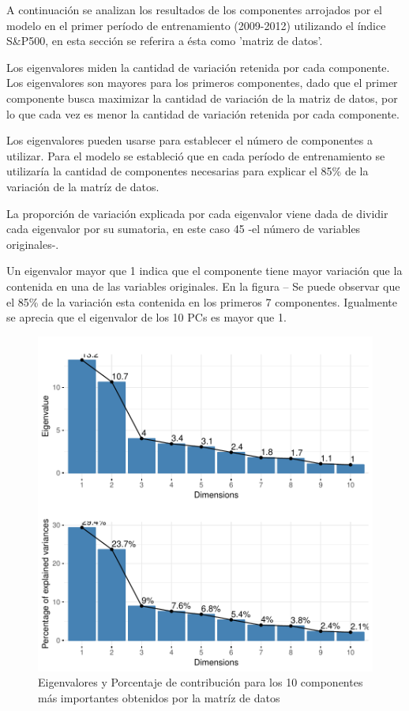 \documentclass[a4paper,12pt]{Latex/Classes/PhDthesisPSnPDF}
\begin{document}
A continuación se analizan los resultados de los componentes arrojados por el modelo en el primer período de entrenamiento (2009-2012) utilizando el índice S&P500, en esta sección se referira a ésta como 'matriz de datos'.


Los eigenvalores miden la cantidad de variación retenida por cada componente. Los eigenvalores son mayores para los primeros componentes, dado que el primer componente busca maximizar la cantidad de variación de la matriz de datos, por lo que cada vez es menor la cantidad de variación retenida por cada componente.

Los eigenvalores pueden usarse para establecer el número de componentes a utilizar. Para el modelo se estableció que en cada período de entrenamiento se utilizaría la cantidad de componentes necesarias para explicar el 85\% de la variación de la matríz de datos.

La proporción de variación explicada por cada eigenvalor viene dada de dividir cada eigenvalor por su sumatoria, en este caso 45 -el número de variables originales-.

Un eigenvalor mayor que 1 indica que el componente tiene mayor variación que la contenida en una de las variables originales. En la figura -- Se puede observar que el 85\% de la variación esta contenida en los primeros 7 componentes. Igualmente se aprecia que el eigenvalor de los 10 PCs es mayor que 1. 

\begin{figure}[H]
\centering
\includegraphics{main-008}
\caption{Eigenvalores y Porcentaje de contribución para los 10 componentes más importantes obtenidos por la matríz de datos}
\end{figure}
\end{document}
